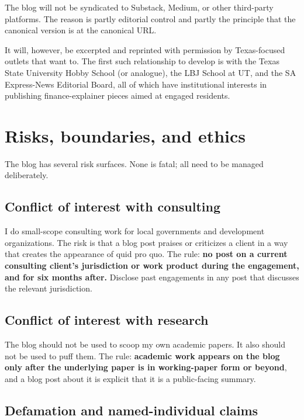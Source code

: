 \documentclass[11pt]{article}
\begin{document}
The blog will not be syndicated to Substack, Medium, or other
third-party platforms. The reason is partly editorial control
and partly the principle that the canonical version is at the
canonical URL.

It will, however, be excerpted and reprinted with permission by
Texas-focused outlets that want to. The first such relationship
to develop is with the Texas State University Hobby School (or
analogue), the LBJ School at UT, and the SA Express-News
Editorial Board, all of which have institutional interests in
publishing finance-explainer pieces aimed at engaged residents.

\section{Risks, boundaries, and ethics}

The blog has several risk surfaces. None is fatal; all need to
be managed deliberately.

\subsection{Conflict of interest with consulting}

I do small-scope consulting work for local governments and
development organizations. The risk is that a blog post praises
or criticizes a client in a way that creates the appearance of
quid pro quo. The rule: \textbf{no post on a current consulting
client's jurisdiction or work product during the engagement, and
for six months after.} Disclose past engagements in any post that
discusses the relevant jurisdiction.

\subsection{Conflict of interest with research}

The blog should not be used to scoop my own academic papers. It
also should not be used to puff them. The rule: \textbf{academic
work appears on the blog only after the underlying paper is in
working-paper form or beyond}, and a blog post about it is
explicit that it is a public-facing summary.

\subsection{Defamation and named-individual claims}
\end{document}
